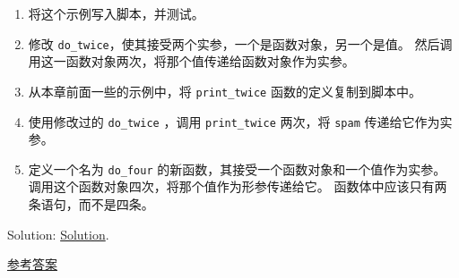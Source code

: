 \begin{exercise}
\begin{enumerate}
\item 将这个示例写入脚本，并测试。

\item 修改 \lstinline{do_twice}，使其接受两个实参，一个是函数对象，另一个是值。
   然后调用这一函数对象两次，将那个值传递给函数对象作为实参。

\item 从本章前面一些的示例中，将 \lstinline{print_twice} 函数的定义复制到脚本中。

\item 使用修改过的 \lstinline{do_twice} ，调用 \lstinline{print_twice} 两次，将 \lstinline{spam} 传递给它作为实参。

\item 定义一个名为 \lstinline{do_four} 的新函数，其接受一个函数对象和一个值作为实参。 调用这个函数对象四次，将那个值作为形参传递给它。 函数体中应该只有两条语句，而不是四条。

\end{enumerate}

Solution: \href{http://thinkpython2.com/code/do_four.py}{Solution}.

\href{http://thinkpython2.com/code/do_four.py}{参考答案}

\end{exercise}



